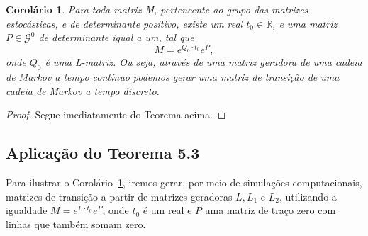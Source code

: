 \documentclass[twoside,openright,titlepage,numbers=noenddot,headinclude,  lineheaders footinclude=true,cleardoublepage=empty,
                                BCOR=5mm,paper=a4,fontsize=12pt ]{scrbook}
\newtheorem{cor}[teo]{Corolário}
\theoremstyle{definition}
\begin{document}
\begin{cor}\label{main}
Para toda matriz M, pertencente ao grupo das matrizes estocásticas, e de determinante positivo,
 existe um real $t_0 \in \mathbb{R}$, e uma matriz $P \in \mathcal{G}^0$
de determinante igual a um, tal que 
\begin{equation*} \label{mainEq}M = e^{Q_0 \cdot t_0} e^{P},\end{equation*}
onde $Q_0$ é uma L-matriz. Ou seja, através de uma matriz geradora de uma cadeia de Markov a tempo contínuo
podemos gerar uma matriz de transição de uma cadeia de Markov a tempo discreto.
\end{cor}
\begin{proof}
Segue imediatamente do Teorema acima.
\end{proof}

\subsection{Aplica\c{c}\~ao do Teorema 5.3}
Para ilustrar o Corolário~\ref{main}, iremos gerar, por meio de simulações computacionais, matrizes de transição a partir de 
matrizes geradoras $L, L_1$ e $L_2$, utilizando a igualdade $M = e^{L \cdot t_0} e^P$, onde $t_0$ é um real e $P$
uma matriz de traço zero com linhas que também somam zero.
\end{document}
